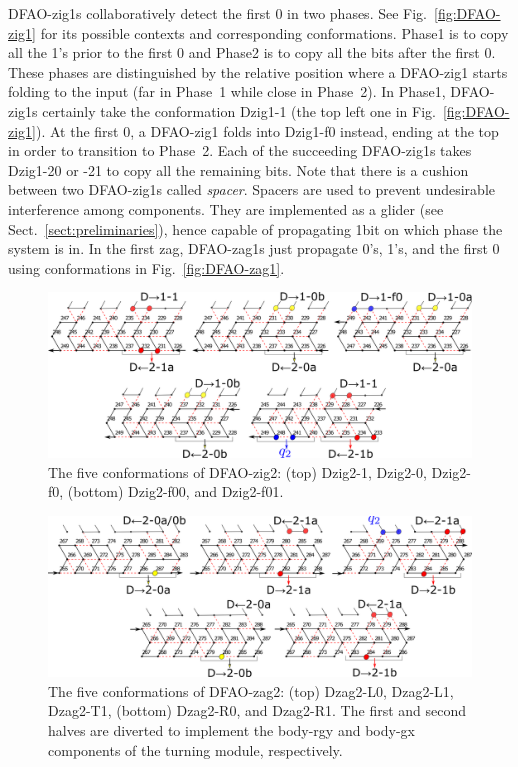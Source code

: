 DFAO-zig1s collaboratively detect the first 0 in two phases.
See Fig.~\ref{fig:DFAO-zig1} for its possible contexts and corresponding conformations. 
Phase1 is to copy all the 1's prior to the first 0 and Phase2 is to copy all the bits after the first 0.
These phases are distinguished by the relative position where a DFAO-zig1 starts folding to the input (far in Phase~1 while close in Phase~2).
In Phase1, DFAO-zig1s certainly take the conformation Dzig1-1 (the top left one in Fig.~\ref{fig:DFAO-zig1}).
At the first 0, a DFAO-zig1 folds into Dzig1-f0 instead, ending at the top in order to transition to Phase~2.
Each of the succeeding DFAO-zig1s takes Dzig1-20 or -21 to copy all the remaining bits. 
Note that there is a cushion between two DFAO-zig1s called \textit{spacer}.
Spacers are used to prevent undesirable interference among components.
They are implemented as a glider (see Sect.~\ref{sect:preliminaries}), hence capable of propagating 1bit on which phase the system is in.
In the first zag, DFAO-zag1s just propagate 0's, 1's, and the first 0 using conformations in Fig.~\ref{fig:DFAO-zag1}.



\begin{figure}[h]
\includegraphics[width=\linewidth]{pic/DFAO-zig2.png}
  \caption{The five conformations of DFAO-zig2: (top) Dzig2-1, Dzig2-0, Dzig2-f0, (bottom) Dzig2-f00, and Dzig2-f01. }
  \label{fig:DFAO-zig2}
\end{figure} 

\begin{figure}[h]
\includegraphics[width=\linewidth]{pic/DFAO-zag2.png}
\caption{The five conformations of DFAO-zag2: (top) Dzag2-L0, Dzag2-L1, Dzag2-T1, (bottom) Dzag2-R0, and Dzag2-R1.
The first and second halves are diverted to implement the body-rgy and body-gx components of the turning module, respectively. 
}
\label{fig:DFAO-zag2}
  \end{figure} 

